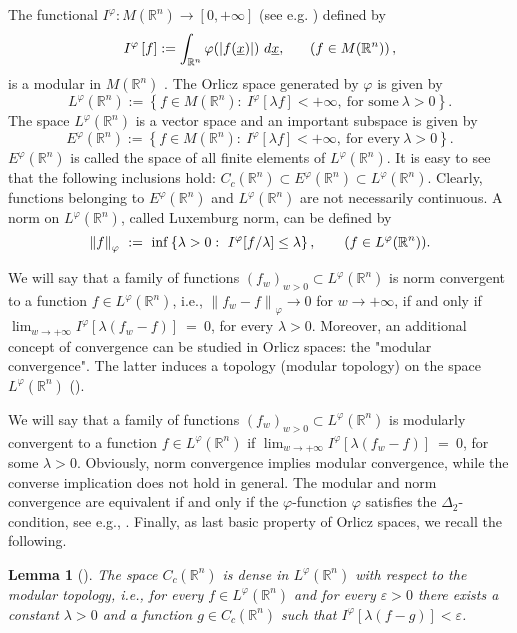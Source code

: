 \documentclass[11pt,a4paper]{article}
\newcommand{\miu}{\leq}
\newcommand{\ep}{\varepsilon}
\newcommand{\R}{\mathbb{R}}
\newtheorem{lemma}[definition]{Lemma}
\begin{document}
  The functional $I^{\varphi} : M(\R^n)\to [0,+\infty]$ (see e.g. \cite{MU1,BAMUVI}) defined by
$$
I^{\varphi} \left[f\right] := \int_{\R^n} \varphi(\left| f(\underline{x}) \right|)\ d\underline{x},\ \hskip0.5cm \left(f \in M(\R^n)\right),
$$
is a modular in $M(\R^n)$ . The Orlicz space generated by $\varphi$ is given by
$$
L^{\varphi}(\R^n) := \left\{f \in M\left(\R^n\right):\ I^{\varphi} [\lambda f]<+\infty,\ \mbox{for\ some}\ \lambda>0\right\}.
$$
The space $L^{\varphi}(\R^n)$ is a vector space and an important subspace is given by
$$
E^{\varphi}(\R^n)  := \left\{f \in M\left(\R^n\right):\ I^{\varphi} [\lambda f]<+\infty,\ \mbox{for\ every}\ \lambda>0\right\}.
$$
$E^{\varphi}(\R^n)$ is called the space of all finite elements of $L^{\varphi}(\R^n)$. It is easy to see that the following inclusions hold:
$
C_c(\R^n) \subset E^{\varphi}(\R^n) \subset L^{\varphi}(\R^n).
$
Clearly, functions belonging to $E^{\varphi}(\R^n)$ and $L^{\varphi}(\R^n)$ are not necessarily continuous. A norm on $L^{\varphi}(\R^n)$, called Luxemburg norm, can be defined by
$$
\left\|f\right\|_{\varphi}\ :=\ \inf \left\{\lambda>0:\ I^{\varphi}[f/\lambda] \miu \lambda\right\}, \hskip0.7cm (f \in L^{\varphi}(\R^n)).
$$

   We will say that a family of functions $(f_w)_{w>0} \subset L^{\varphi}(\R^n)$ is norm convergent to a function $f \in L^{\varphi}(\R^n)$, i.e., $\left\|f_w-f\right\|_{\varphi}\rightarrow 0$ for $w\to +\infty$, if and only if 
$\lim_{w \to +\infty} I^{\varphi}\left[\lambda(f_w-f)\right]\ =\ 0$, for every $\lambda>0$.
Moreover, an additional concept of convergence can be studied in Orlicz spaces: the "modular convergence". The latter induces a topology (modular topology) on the space $L^{\varphi}(\R^n)$ (\cite{MU1,BAMUVI}). 

  We will say that a family of functions $(f_w)_{w>0} \subset L^{\varphi}(\R^n)$ is modularly convergent to a function $f \in L^{\varphi}(\R^n)$ if
$
\lim_{w \to +\infty} I^{\varphi}\left[\lambda(f_w-f)\right]\ =\ 0$,
for some $\lambda>0$. Obviously, norm convergence implies modular convergence, while the converse implication does not hold in general. The modular and norm convergence are equivalent if and only if the $\varphi$-function $\varphi$ satisfies the $\Delta_2$-condition, see e.g., \cite{MU1,BAMUVI}. Finally, as last basic property of Orlicz spaces, we recall the following.
\begin{lemma}[\cite{BAMA}] \label{lemma1}
The space $C_c(\R^n)$ is dense in $L^{\varphi}(\R^n)$ with respect to the modular topology, i.e., for every $f \in L^{\varphi}(\R^n)$ and for every $\ep>0$ there exists a constant $\lambda>0$ and a function $g \in C_c(\R^n)$ such that $I^{\varphi}[\lambda(f-g)]<\ep$.
\end{lemma}
\end{document}
